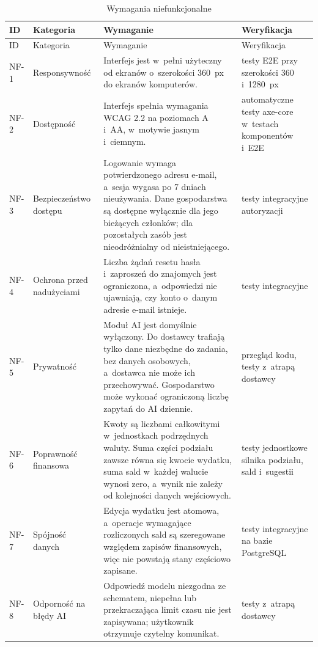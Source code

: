 \begin{small}
\begin{longtable}{@{}p{1.1cm}>{\raggedright\arraybackslash}p{2.6cm}>{\raggedright\arraybackslash}p{6.7cm}>{\raggedright\arraybackslash}p{3.3cm}@{}}
  \caption{Wymagania niefunkcjonalne}\label{tab:wymagania-niefunkcjonalne}\\
  \toprule
  ID & Kategoria & Wymaganie & Weryfikacja \\
  \midrule
  \endfirsthead
  \toprule
  ID & Kategoria & Wymaganie & Weryfikacja \\
  \midrule
  \endhead
  \bottomrule
  \endfoot
  NF-1 & Responsywność & Interfejs jest w~pełni użyteczny od ekranów o~szerokości 360~px do ekranów komputerów. & testy E2E przy szerokości 360 i~1280~px \\
  NF-2 & Dostępność & Interfejs spełnia wymagania WCAG 2.2 na poziomach A i~AA, w~motywie jasnym i~ciemnym. & automatyczne testy axe-core w~testach komponentów i~E2E \\
  NF-3 & Bezpieczeństwo dostępu & Logowanie wymaga potwierdzonego adresu e-mail, a~sesja wygasa po 7 dniach nieużywania. Dane gospodarstwa są dostępne wyłącznie dla jego bieżących członków; dla pozostałych zasób jest nieodróżnialny od nieistniejącego. & testy integracyjne autoryzacji \\
  NF-4 & Ochrona przed nadużyciami & Liczba żądań resetu hasła i~zaproszeń do znajomych jest ograniczona, a~odpowiedzi nie ujawniają, czy konto o~danym adresie e-mail istnieje. & testy integracyjne \\
  NF-5 & Prywatność & Moduł AI jest domyślnie wyłączony. Do dostawcy trafiają tylko dane niezbędne do zadania, bez danych osobowych, a~dostawca nie może ich przechowywać. Gospodarstwo może wykonać ograniczoną liczbę zapytań do AI dziennie. & przegląd kodu, testy z~atrapą dostawcy \\
  NF-6 & Poprawność finansowa & Kwoty są liczbami całkowitymi w~jednostkach podrzędnych waluty. Suma części podziału zawsze równa się kwocie wydatku, suma sald w~każdej walucie wynosi zero, a~wynik nie zależy od kolejności danych wejściowych. & testy jednostkowe silnika podziału, sald i~sugestii \\
  NF-7 & Spójność danych & Edycja wydatku jest atomowa, a~operacje wymagające rozliczonych sald są szeregowane względem zapisów finansowych, więc nie powstają stany częściowo zapisane. & testy integracyjne na bazie PostgreSQL \\
  NF-8 & Odporność na błędy AI & Odpowiedź modelu niezgodna ze schematem, niepełna lub przekraczająca limit czasu nie jest zapisywana; użytkownik otrzymuje czytelny komunikat. & testy z~atrapą dostawcy \\

\end{longtable}
\end{small}
